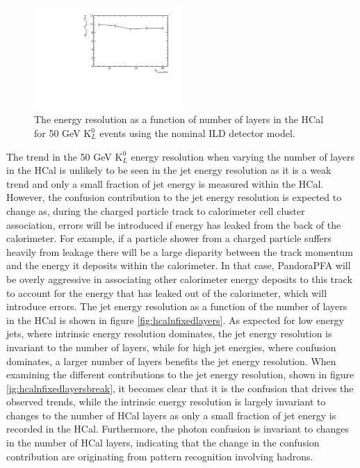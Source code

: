 \begin{figure}
\centering
\includegraphics[width=0.5\textwidth]{OptimisationStudies/Plots/EnergyResolution/ER_vs_HCalNFixedLayers_50GeVKaon0L.pdf}
\caption[The energy resolution as a function of number of layers in the HCal for 50 GeV $\text{K}^{0}_{L}$ events using the nominal ILD detector model.]{The energy resolution as a function of number of layers in the HCal for 50 GeV $\text{K}^{0}_{L}$ events using the nominal ILD detector model.}
\label{fig:hcalnfixedlayerser}
\end{figure}

The trend in the 50 GeV $\text{K}^{0}_{L}$ energy resolution when varying the number of layers in the HCal is unlikely to be seen in the jet energy resolution as it is a weak trend and only a small fraction of jet energy is measured within the HCal.  However, the confusion contribution to the jet energy resolution is expected to change as, during the charged particle track to calorimeter cell cluster association, errors will be introduced if energy has leaked from the back of the calorimeter.  For example, if a particle shower from a charged particle suffers heavily from leakage there will be a large disparity between the track momentum and the energy it deposits within the calorimeter.  In that case, PandoraPFA will be overly aggressive in associating other calorimeter energy deposits to this track to account for the energy that has leaked out of the calorimeter, which will introduce errors.  The jet energy resolution as a function of the number of layers in the HCal is shown in figure \ref{fig:hcalnfixedlayers}.  As expected for low energy jets, where intrinsic energy resolution dominates, the jet energy resolution is invariant to the number of layers, while for high jet energies, where confusion dominates, a larger number of layers benefits the jet energy resolution.  When examining the different contributions to the jet energy resolution, shown in figure \ref{ig:hcalnfixedlayersbreak}, it becomes clear that it is the confusion that drives the observed trends, while the intrinsic energy resolution is largely invariant to changes to the number of HCal layers as only a small fraction of jet energy is recorded in the HCal.  Furthermore, the photon confusion is invariant to changes in the number of HCal layers, indicating that the change in the confusion contribution are originating from pattern recognition involving hadrons.

